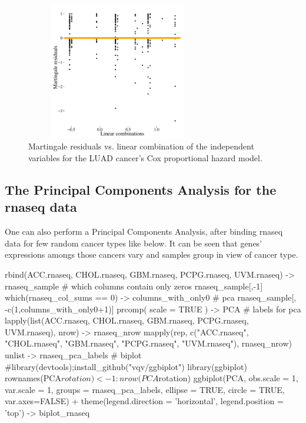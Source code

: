 \begin{figure}[h!]
\begin{centering}
\includegraphics[width=8cm, height=6cm]{res_lp_mart.pdf}
\caption{\label{figRes}Martingale residuals vs. linear combination of the independent variables for the LUAD cancer's Cox proportional hazard model. }
\end{centering}
\end{figure}

\newpage

\subsection{The Principal Components Analysis for the rnaseq
data}\label{the-principal-components-analysis-for-the-rnaseq-data}

One can also perform a Principal Components Analysis, after binding
rnaseq data for few random cancer types like below. It can be seen that
genes' expressions amongs those cancers vary and samples group in view
of cancer type.

\begin{Schunk}
\begin{Sinput}
rbind(ACC.rnaseq, CHOL.rnaseq, GBM.rnaseq, PCPG.rnaseq, UVM.rnaseq) -> rnaseq_sample
# which columns contain only zeros
rnaseq_sample[,-1] %
which(rnaseq_col_sums == 0) -> columns_with_only0
# pca
rnaseq_sample[, -c(1,columns_with_only0+1)] %
   prcomp( scale = TRUE ) -> PCA
# labels for pca
lapply(list(ACC.rnaseq, CHOL.rnaseq, GBM.rnaseq, PCPG.rnaseq, UVM.rnaseq), nrow) -> rnaseq_nrow
mapply(rep, 
       c("ACC.rnaseq", "CHOL.rnaseq", "GBM.rnaseq", "PCPG.rnaseq", "UVM.rnaseq"), 
       rnaseq_nrow) %
   unlist -> rnaseq_pca_labels
# biplot
#library(devtools);install_github("vqv/ggbiplot")
library(ggbiplot)
rownames(PCA$rotation) <- 1:nrow(PCA$rotation)
ggbiplot(PCA, obs.scale = 1, var.scale = 1,
  groups = rnaseq_pca_labels, ellipse = TRUE, circle = TRUE, var.axes=FALSE) +
  theme(legend.direction = 'horizontal', legend.position = 'top') -> biplot_rnaseq
\end{Sinput}
\end{Schunk}


